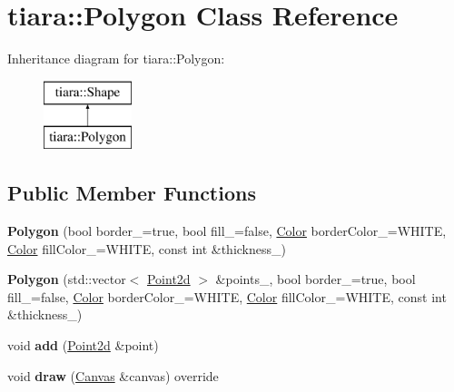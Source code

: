 \hypertarget{classtiara_1_1Polygon}{}\section{tiara\+::Polygon Class Reference}
\label{classtiara_1_1Polygon}
Inheritance diagram for tiara\+::Polygon\+:\begin{figure}[H]
\begin{center}
\leavevmode
\includegraphics[height=2.000000cm]{classtiara_1_1Polygon}
\end{center}
\end{figure}
\subsection*{Public Member Functions}
\begin{DoxyCompactItemize}
\item 
\mbox{\label{classtiara_1_1Polygon_a827cc2e528e055f103bb5aeca22752d0}} 
{\bfseries Polygon} (bool border\+\_\+=true, bool fill\+\_\+=false, \mbox{\hyperlink{classtiara_1_1Color}{Color}} border\+Color\+\_\+=W\+H\+I\+TE, \mbox{\hyperlink{classtiara_1_1Color}{Color}} fill\+Color\+\_\+=W\+H\+I\+TE, const int \&thickness\+\_)
\item 
\mbox{\label{classtiara_1_1Polygon_af81f0e107fb5f60340af61c49d4dfb53}} 
{\bfseries Polygon} (std\+::vector$<$ \mbox{\hyperlink{classtiara_1_1Point2d}{Point2d}} $>$ \&points\+\_\+, bool border\+\_\+=true, bool fill\+\_\+=false, \mbox{\hyperlink{classtiara_1_1Color}{Color}} border\+Color\+\_\+=W\+H\+I\+TE, \mbox{\hyperlink{classtiara_1_1Color}{Color}} fill\+Color\+\_\+=W\+H\+I\+TE, const int \&thickness\+\_)
\item 
\mbox{\label{classtiara_1_1Polygon_ac183b2154082dc5726813c2c3b2f0817}} 
void {\bfseries add} (\mbox{\hyperlink{classtiara_1_1Point2d}{Point2d}} \&point)
\item 
\mbox{\label{classtiara_1_1Polygon_a3dc6d23d09757195781a984de8b46350}} 
void {\bfseries draw} (\mbox{\hyperlink{classtiara_1_1Canvas}{Canvas}} \&canvas) override
\end{DoxyCompactItemize}
